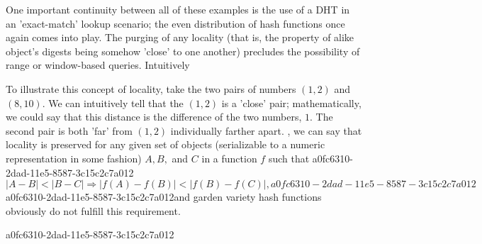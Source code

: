 \documentclass[12pt]{article}
\begin{document}
\par One important continuity between all of these examples is the use of a DHT in an 'exact-match' lookup scenario; the even distribution of hash functions once again comes into play. The purging of any locality (that is, the property of alike object's digests being somehow 'close' to one another) precludes the possibility of range or window-based queries. Intuitively

\par To illustrate this concept of locality, take the two pairs of numbers $(1,2)$ and $(8,10)$. We can intuitively tell that the $(1,2)$ is a 'close' pair; mathematically, we could say that this distance is the difference of the two numbers, $1$. The second pair is both 'far' from $(1,2)$ individually farther apart. , we can say that locality is preserved for any given set of objects (serializable to a numeric representation in some fashion) $A,B,$ and $C$ in a function $f$ such that
a0fc6310-2dad-11e5-8587-3c15c2c7a012\begin{equation}
|A-B| < |B-C| \Rightarrow |f(A)-f(B)| < |f(B) - f(C)|,
a0fc6310-2dad-11e5-8587-3c15c2c7a012\end{equation}
a0fc6310-2dad-11e5-8587-3c15c2c7a012and garden variety hash functions obviously do not fulfill this requirement.

a0fc6310-2dad-11e5-8587-3c15c2c7a012\printbibliography
\end{document}
